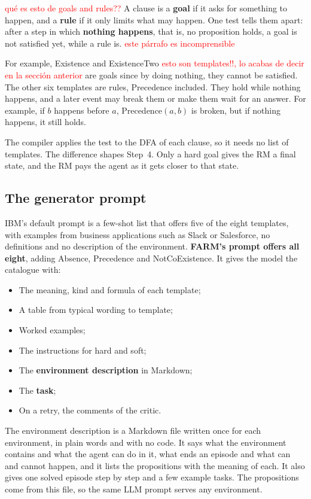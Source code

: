 \documentclass[11pt,english,listoffigures,listoftables]{tfgetsinf}
\begin{document}
\textcolor{red}{qué es esto de goals and rules??}
A clause is a \textbf{goal} if it asks for something to happen, and a \textbf{rule} if it only limits what may happen. One test tells them apart: after a step in which \textbf{nothing happens}, that is, no proposition holds, a goal is not satisfied yet, while a rule is. \textcolor{red}{este párrafo es incomprensible}

For example, Existence and ExistenceTwo \textcolor{red}{esto son templates!!, lo acabas de decir en la sección anterior} are goals since by doing nothing, they cannot be satisfied. The other six templates are rules, Precedence included. They hold while nothing happens, and a later event may break them or make them wait for an answer. For example, if $b$ happens before $a$, Precedence$(a,b)$ is broken, but if nothing happens, it still holds.

The compiler applies the test to the DFA of each clause, so it needs no list of templates. The difference shapes Step~4. Only a hard goal gives the RM a final state, and the RM pays the agent as it gets closer to that state.

\subsection{The generator prompt}
IBM's default prompt is a few-shot list that offers five of the eight templates, with examples from business applications such as Slack or Salesforce, no definitions and no description of the environment. \textbf{FARM's prompt offers all eight}, adding Absence, Precedence and NotCoExistence. It gives the model the catalogue with:

\begin{itemize}
    \item The meaning, kind and formula of each template;
    \item A table from typical wording to template;
    \item Worked examples;
    \item The instructions for hard and soft;
    \item The \textbf{environment description} in Markdown;
    \item The \textbf{task};
    \item On a retry, the comments of the critic.
\end{itemize}

The environment description is a Markdown file written once for each environment, in plain words and with no code. It says what the environment contains and what the agent can do in it, what ends an episode and what can and cannot happen, and it lists the propositions with the meaning of each. It also gives one solved episode step by step and a few example tasks. The propositions come from this file, so the same LLM prompt serves any environment.
    
\end{document}
